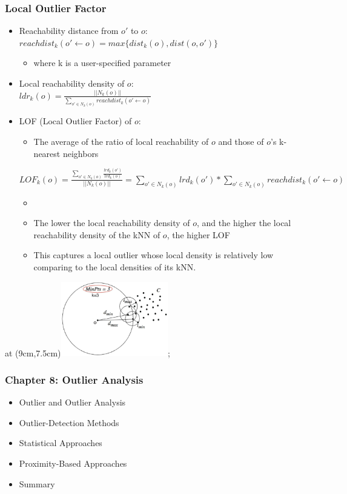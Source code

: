 \documentclass[aspectratio=169,t,xcolor=dvipsnames]{beamer}
\begin{document}
\begin{frame}
	\frametitle{Local Outlier Factor}
	\begin{itemize}
		\item \alert{Reachability distance from $o'$ to $o$:}\\
		       $reachdist_k(o' \leftarrow o) = max\{dist_k(o),dist(o,o')\}$
		      \begin{itemize}
		      	\item where k is a user-specified parameter
		      \end{itemize}
		\item \alert{Local reachability density of $o$:}\\
		$ldr_k(o) = \frac{||N_k(o)||}{\sum_{o' \in N_k(o)}reachdist_k(o' \leftarrow o)}$
		\item \alert{LOF (Local Outlier Factor) of $o$:}
		      \begin{itemize}
		      	\item The average of the ratio of local reachability of $o$ and those of $o$'s k-nearest neighbors
		      \end{itemize}
		$ LOF_k(o)=\frac{\sum_{o' \in N_k(o)}\frac{lrd_k(o')}{lrd_k(o)} }{||N_k(o)||} =
		    \sum_{o' \in N_k(o)}lrd_k(o') * \sum_{o' \in N_k(o)}reachdist_k(o' \leftarrow o)
		$
		      \begin{itemize}
		      	\item 
		      	\item The lower the local reachability density of $o$, and the higher the local reachability density of the kNN of $o$, the higher LOF
		      	\item This captures a local outlier whose local density is relatively low comparing to the local densities of its kNN.
		      \end{itemize}
	\end{itemize}
	
	\tikzoverlay at (9cm,7.5cm){\includegraphics[width=0.35\textwidth]{img/density.png}};
\end{frame}

%

\begin{frame}
	\frametitle{Chapter 8: Outlier Analysis}
	\begin{itemize}
		\item Outlier and Outlier Analysis
		\item Outlier-Detection Methods
		\item Statistical Approaches
		\item Proximity-Based Approaches
		\item \alert{Summary}
	\end{itemize}
\end{frame}
\end{document}
